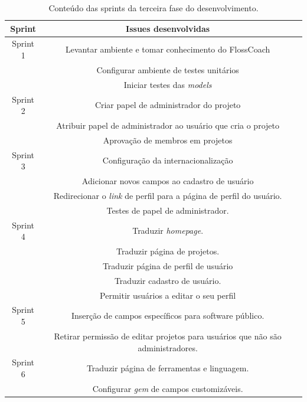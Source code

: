 \begin{table}[h]
	\centering
	\begin{tabular}{ccc}
		\toprule
		\textbf{Sprint} & \textbf{Issues desenvolvidas} \\
		\midrule
		Sprint 1 & Levantar ambiente e tomar conhecimento do FlossCoach \\
			 & Configurar ambiente de testes unitários \\
			 & Iniciar testes das \textit{models}\\
		\midrule
		Sprint 2 & Criar papel de administrador do projeto\\
			 & Atribuir papel de administrador ao usuário que cria o projeto \\
			 & Aprovação de membros em projetos \\
		\midrule		
		Sprint 3 & Configuração da internacionalização \\
			 & Adicionar novos campos ao cadastro de usuário\\
			 & Redirecionar o \textit{link} de perfil para a página de perfil do usuário.\\
			 & Testes de papel de administrador.\\
		\midrule		
		Sprint 4 & Traduzir \textit{homepage}.\\
			 & Traduzir página de projetos.\\
			 & Traduzir página de perfil de usuário\\
			 & Traduzir cadastro de usuário.\\ 
			 & Permitir usuários a editar o seu perfil\\
		\midrule		
		Sprint 5 & Inserção de campos específicos para software público.\\
			 & Retirar permissão de editar projetos para usuários que não são administradores.\\
		\midrule
		Sprint 6 & Traduzir página de ferramentas e linguagem.\\
			 & Configurar \textit{gem} de campos customizáveis.\\
		\bottomrule
	\end{tabular}

	\caption{Conteúdo das sprints da terceira fase do desenvolvimento.}
	\label{issues}
\end{table}


